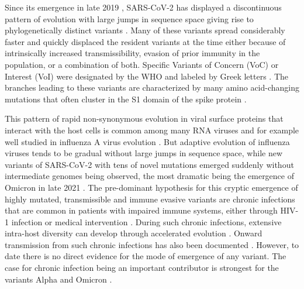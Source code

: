 \documentclass[aps,rmp, twocolumn]{revtex4}
\begin{document}
Since its emergence in late 2019 \citep{zhu_novel_2020}, SARS-CoV-2 has displayed a discontinuous pattern of evolution with large jumps in sequence space giving rise to phylogenetically distinct variants \citep{hodcroft_spread_2021,volz_assessing_2021,tegally_detection_2021,faria_genomics_2021,naveca_covid-19_2021,viana_rapid_2022}.
Many of these variants spread considerably faster and quickly displaced the resident variants at the time either because of intrinsically increased transmissibility, evasion of prior immunity in the population, or a combination of both.
Specific Variants of Concern (VoC) or Interest (VoI) were designated by the WHO and labeled by Greek letters \citep{konings_sars-cov-2_2021}.
The branches leading to these variants are characterized by many amino acid-changing mutations that often cluster in the S1 domain of the spike protein \citep{kistler_rapid_2022}.

This pattern of rapid non-synonymous evolution in viral surface proteins that interact with the host cells is common among many RNA viruses and for example well studied in influenza A virus evolution \citep{bhatt_genomic_2011,strelkowa_clonal_2012}.
But adaptive evolution of influenza viruses tends to be gradual without large jumps in sequence space, while new variants of SARS-CoV-2 with tens of novel mutations emerged suddenly without intermediate genomes being observed, the most dramatic being the emergence of Omicron in late 2021 \citep{viana_rapid_2022}.
The pre-dominant hypothesis for this cryptic emergence of highly mutated, transmissible and immune evasive variants are chronic infections that are common in patients with impaired immune systems, either through HIV-1 infection \citep{cele_sars-cov-2_2022} or medical intervention \citep{choi_persistence_2020,kemp_sars-cov-2_2021}.
During such chronic infections, extensive intra-host diversity can develop through accelerated evolution
\citep{chaguza_accelerated_2022}.
Onward transmission from such chronic infections has also been documented \citep{gonzalez-reiche_intrahost_2022}.
However, to date there is no direct evidence for the mode of emergence of any variant.
The case for chronic infection being an important contributor is strongest for the variants Alpha and Omicron \citep{hill_origins_2022}.
\end{document}
